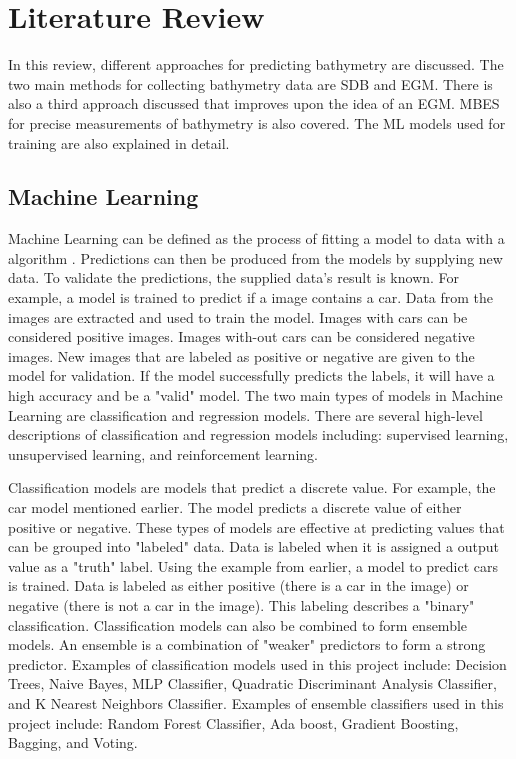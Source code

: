 \section{Literature Review}
\setlength{\parindent}{10ex}
In this review, different approaches for predicting bathymetry are discussed.
The two main methods for collecting bathymetry data are \ac{SDB} and \ac{EGM}.
There is also a third approach discussed that improves upon the idea of an \ac{EGM}.
\ac{MBES} for precise measurements of bathymetry \cite{farr1980multibeam} is also covered.
The \ac{ML} models used for training are also explained in detail.

\subsection{Machine Learning}
Machine Learning can be defined as the process of fitting a model to data with a algorithm \cite{bishop2006pattern}.
Predictions can then be produced from the models by supplying new data.
To validate the predictions, the supplied data's result is known.
For example, a model is trained to predict if a image contains a car.
Data from the images are extracted and used to train the model.
Images with cars can be considered positive images.
Images with-out cars can be considered negative images.
New images that are labeled as positive or negative are given to the model for validation.
If the model successfully predicts the labels, it will have a high accuracy and be a "valid" model.
The two main types of models in Machine Learning are classification and regression models.
There are several high-level descriptions of classification and regression models including: supervised learning, unsupervised learning, and reinforcement learning.

\par
Classification models are models that predict a discrete value.
For example, the car model mentioned earlier.
The model predicts a discrete value of either positive or negative.
These types of models are effective at predicting values that can be grouped into "labeled" data.
Data is labeled when it is assigned a output value as a "truth" label.
Using the example from earlier, a model to predict cars is trained.
Data is labeled as either positive (there is a car in the image) or negative (there is not a car in the image).
This labeling describes a "binary" classification.
Classification models can also be combined to form ensemble models.
An ensemble is a combination of "weaker" predictors to form a strong predictor.
Examples of classification models used in this project include: Decision Trees, Naive Bayes, MLP Classifier, Quadratic Discriminant Analysis Classifier, and K Nearest Neighbors Classifier.
Examples of ensemble classifiers used in this project include: Random Forest Classifier, Ada boost, Gradient Boosting, Bagging, and Voting.

